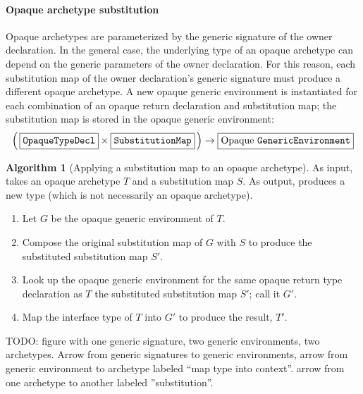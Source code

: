 \documentclass[a4paper,headsepline,bibliography=totoc,toc=flat,fleqn,twoside=semi]{scrbook}
\theoremstyle{definition}
\theoremstyle{definition}
\theoremstyle{definition}
\newtheorem{algorithm}{Algorithm}[chapter]
\newcommand{\mathboxed}[1]{\boxed{\mbox{\vphantom{pI\texttt{pI}}#1}}}
\newcommand{\ttbox}[1]{\boxed{\mbox{\vphantom{pI\texttt{pI}}\texttt{#1}}}}
\begin{document}
\paragraph{Opaque archetype substitution}
Opaque archetypes are parameterized by the generic signature of the owner declaration. In the general case, the underlying type of an opaque archetype can depend on the generic parameters of the owner declaration. For this reason, each substitution map of the owner declaration's generic signature must produce a different opaque archetype. A new opaque generic environment is instantiated for each combination of an opaque return declaration and substitution map; the substitution map is stored in the opaque generic environment:
\[\left(\,\ttbox{OpaqueTypeDecl}\times \ttbox{SubstitutionMap}\,\right) \rightarrow \mathboxed{Opaque \texttt{GenericEnvironment}}\]

\begin{algorithm}[Applying a substitution map to an opaque archetype]\label{opaquearchetypesubst}
As input, takes an opaque archetype $T$ and a substitution map $S$. As output, produces a new type (which is not necessarily an opaque archetype).
\begin{enumerate}
\item Let $G$ be the opaque generic environment of $T$.
\item Compose the original substitution map of $G$ with $S$ to produce the substituted substitution map $S'$.
\item Look up the opaque generic environment for the same opaque return type declaration as $T$ the substituted substitution map $S'$; call it $G'$.
\item Map the interface type of $T$ into $G'$ to produce the result, $T'$.
\end{enumerate}
\end{algorithm}

TODO: figure with one generic signature, two generic environments, two archetypes. Arrow from generic signatures to generic environments, arrow from generic environment to archetype labeled ``map type into context''. arrow from one archetype to another labeled ''substitution''.
\end{document}
